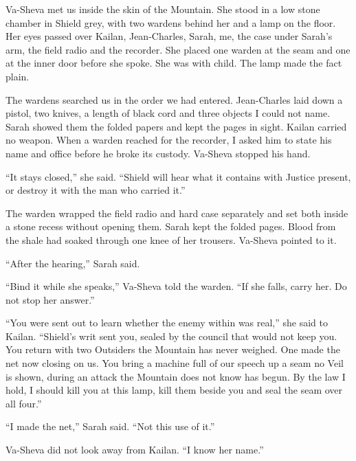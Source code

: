 \ornament

Va-Sheva met us inside the skin of the Mountain. She stood in a low stone chamber in Shield grey, with two wardens behind her and a lamp on the floor. Her eyes passed over Kailan, Jean-Charles, Sarah, me, the case under Sarah's arm, the field radio and the recorder. She placed one warden at the seam and one at the inner door before she spoke. She was with child. The lamp made the fact plain.\par

The wardens searched us in the order we had entered. Jean-Charles laid down a pistol, two knives, a length of black cord and three objects I could not name. Sarah showed them the folded papers and kept the pages in sight. Kailan carried no weapon. When a warden reached for the recorder, I asked him to state his name and office before he broke its custody. Va-Sheva stopped his hand.\par

``It stays closed,'' she said. ``Shield will hear what it contains with Justice present, or destroy it with the man who carried it.''\par

The warden wrapped the field radio and hard case separately and set both inside a stone recess without opening them. Sarah kept the folded pages. Blood from the shale had soaked through one knee of her trousers. Va-Sheva pointed to it.\par

``After the hearing,'' Sarah said.\par

``Bind it while she speaks,'' Va-Sheva told the warden. ``If she falls, carry her. Do not stop her answer.''\par

``You were sent out to learn whether the enemy within was real,'' she said to Kailan. ``Shield's writ sent you, sealed by the council that would not keep you. You return with two Outsiders the Mountain has never weighed. One made the net now closing on us. You bring a machine full of our speech up a seam no Veil is shown, during an attack the Mountain does not know has begun. By the law I hold, I should kill you at this lamp, kill them beside you and seal the seam over all four.''\par

``I made the net,'' Sarah said. ``Not this use of it.''\par

Va-Sheva did not look away from Kailan. ``I know her name.''\par

